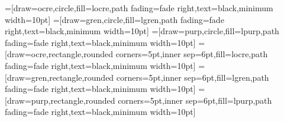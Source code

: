 \usepackage{amsmath,amsfonts,amssymb} %

\usepackage{makecell} %
\usepackage{pifont}
\usepackage{float}
\usepackage{nameref}
\usepackage[nice]{nicefrac}
\usepackage{marginnote}
\usepackage{stackengine} %
\usepackage[breakwords]{truncate}
\usepackage{etoolbox} %
\newcommand*{\diff}{\mathop{}\:\!d}

\usepackage{graphicx} %
\usepackage{colortbl}

\graphicspath{{images/}} %

\usepackage{tikz} %
\usepackage{tikz-3dplot} %
\usetikzlibrary{arrows.meta}
\usetikzlibrary{shapes}
\usetikzlibrary{calc,fadings,decorations.pathreplacing,angles,positioning,fit,backgrounds,fpu}
\usepackage{pgfplots}
\pgfplotsset{compat=1.12}

\newcommand{\RightAngle}[5][3pt]{%
	\draw[#5] ($#3!#1!#2$)
	--($ #3!2!($($#3!#1!#2$)!.5!($#3!#1!#4$)$) $)
	--($#3!#1!#4$) ;
}

\newcommand{\transformarrow}[1]{$\xrightarrow{\ \ \text{#1} \ }$}

\newcommand\Mydiv[2]{%
	\strut#1\kern.25em\smash{\raise.3ex\hbox{\big)}}\mkern-8mu
	\overline{\enspace\strut#2}}

=[draw=ocre,circle,fill=locre,path fading=fade right,text=black,minimum width=10pt]
=[draw=gren,circle,fill=lgren,path fading=fade right,text=black,minimum width=10pt]
=[draw=purp,circle,fill=lpurp,path fading=fade right,text=black,minimum width=10pt]
=[draw=ocre,rectangle,rounded corners=5pt,inner sep=6pt,fill=locre,path fading=fade right,text=black,minimum width=10pt]
=[draw=gren,rectangle,rounded corners=5pt,inner sep=6pt,fill=lgren,path fading=fade right,text=black,minimum width=10pt]
=[draw=purp,rectangle,rounded corners=5pt,inner sep=6pt,fill=lpurp,path fading=fade right,text=black,minimum width=10pt]

